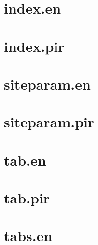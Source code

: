 \let\mypdfximage\pdfximage\def\pdfximage{\immediate\mypdfximage}\documentclass[twoside]{book}
\newcommand{\+}{\discretionary{\mbox{\scriptsize$\hookleftarrow$}}{}{}}
\begin{document}
\chapter{index.\+en}
\label{md_themes_relearn_exampleSite_content_shortcodes_resources_index_en}

\chapter{index.\+pir}
\label{md_themes_relearn_exampleSite_content_shortcodes_resources_index_pir}

\chapter{siteparam.\+en}
\label{md_themes_relearn_exampleSite_content_shortcodes_siteparam_en}

\chapter{siteparam.\+pir}
\label{md_themes_relearn_exampleSite_content_shortcodes_siteparam_pir}

\chapter{tab.\+en}
\label{md_themes_relearn_exampleSite_content_shortcodes_tab_en}

\chapter{tab.\+pir}
\label{md_themes_relearn_exampleSite_content_shortcodes_tab_pir}

\chapter{tabs.\+en}
\label{md_themes_relearn_exampleSite_content_shortcodes_tabs_en}

\end{document}
